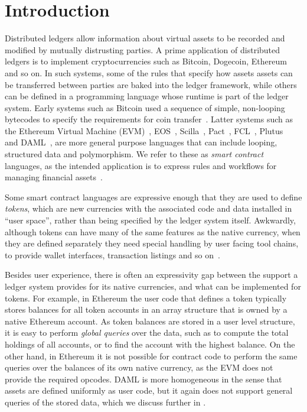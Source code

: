 
\section{Introduction}
Distributed ledgers allow information about virtual assets to be recorded and modified by mutually distrusting parties. A prime application of distributed ledgers is to implement cryptocurrencies such as Bitcoin, Dogecoin, Ethereum and so on. In such systems, some of the rules that specify how assets assets can be transferred between parties are baked into the ledger framework, while others can be defined in a programming language whose runtime is part of the ledger system. Early systems such as Bitcoin used a sequence of simple, non-looping bytecodes to specify the requirements for coin transfer~\cite{Atzei2017:BitcoinTransactions}. Latter systems such as the Ethereum Virtual Machine (EVM)~\cite{Wood2014:Ethereum}, EOS~\cite{Grigg2017:EosIntroduction}, Scilla~\cite{Sergey2018:Scilla}, Pact~\cite{Popejpy2016:Pact}, FCL~\cite{Adjoint2019:FCL}, Plutus~\cite{IOHK2018:Plutus} and DAML~\cite{DA2019:DAML}, are more general purpose languages that can include looping, structured data and polymorphism. We refer to these as \emph{smart contract} languages, as the intended application is to express rules and workflows for managing financial assets~\cite{Harz2018:SurveyLanguages}.

Some smart contract languages are expressive enough that they are used to define \emph{tokens}, which are new currencies with the associated code and data installed in ``user space'', rather than being specified by the ledger system itself. Awkwardly, although tokens can have many of the same features as the native currency, when they are defined separately they need special handling by user facing tool chains, to provide wallet interfaces, transaction listings and so on~\cite{Vogelsteller2015:ERC20}.

Besides user experience, there is often an expressivity gap between the support a ledger system provides for its native currencies, and what can be implemented for tokens. For example, in Ethereum the user code that defines a token typically stores balances for all token accounts in an array structure that is owned by a native Ethereum account. As token balances are stored in a user level structure, it is easy to perform \emph{global queries} over the data, such as to compute the total holdings of all accounts, or to find the account with the highest balance. On the other hand, in Ethereum it is not possible for contract code to perform the same queries over the balances of its own native currency, as the EVM does not provide the required opcodes. DAML is more homogeneous in the sense that assets are defined uniformly as user code, but it again does not support general queries of the stored data, which we discuss further in \REF.

